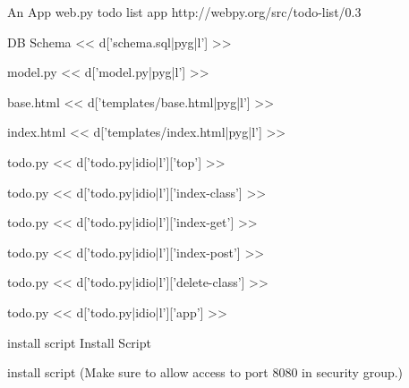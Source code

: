 \documentclass{beamer}
\begin{document}
\begin{frame}{An App}
web.py todo list app
http://webpy.org/src/todo-list/0.3
\end{frame}

\begin{frame}[fragile]{DB Schema}
<< d['schema.sql|pyg|l'] >>
\end{frame}

\footnotesize

\begin{frame}[fragile]{model.py}
<< d['model.py|pyg|l'] >>
\end{frame}

\begin{frame}[fragile]{base.html}
<< d['templates/base.html|pyg|l'] >>
\end{frame}

\begin{frame}[fragile]{index.html}
\scriptsize
<< d['templates/index.html|pyg|l'] >>
\footnotesize
\end{frame}

\begin{frame}[fragile]{todo.py}
<< d['todo.py|idio|l']['top'] >>
\end{frame}

\begin{frame}[fragile]{todo.py}
<< d['todo.py|idio|l']['index-class'] >>
\end{frame}

\begin{frame}[fragile]{todo.py}
<< d['todo.py|idio|l']['index-get'] >>
\end{frame}

\begin{frame}[fragile]{todo.py}
<< d['todo.py|idio|l']['index-post'] >>
\end{frame}

\begin{frame}[fragile]{todo.py}
<< d['todo.py|idio|l']['delete-class'] >>
\end{frame}

\begin{frame}[fragile]{todo.py}
<< d['todo.py|idio|l']['app'] >>
\end{frame}

\begin{frame}[fragile]{install script}
Install Script
\end{frame}



\begin{frame}[fragile]{install script}
\normalsize
(Make sure to allow access to port 8080 in security group.)
\end{frame}
\end{document}
